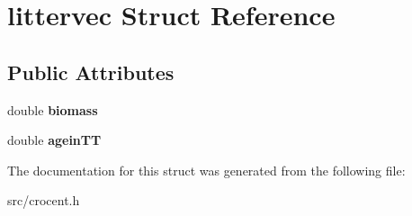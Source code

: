 \hypertarget{structlittervec}{\section{littervec Struct Reference}
\label{structlittervec}
}
\subsection*{Public Attributes}
\begin{DoxyCompactItemize}
\item 
\hypertarget{structlittervec_a93afec28fbb904fcb4517d000c2214a7}{double {\bfseries biomass}}\label{structlittervec_a93afec28fbb904fcb4517d000c2214a7}

\item 
\hypertarget{structlittervec_ad984d299e959bbbc51e1dd2abaac8293}{double {\bfseries agein\-T\-T}}\label{structlittervec_ad984d299e959bbbc51e1dd2abaac8293}

\end{DoxyCompactItemize}


The documentation for this struct was generated from the following file\-:\begin{DoxyCompactItemize}
\item 
src/crocent.\-h\end{DoxyCompactItemize}
